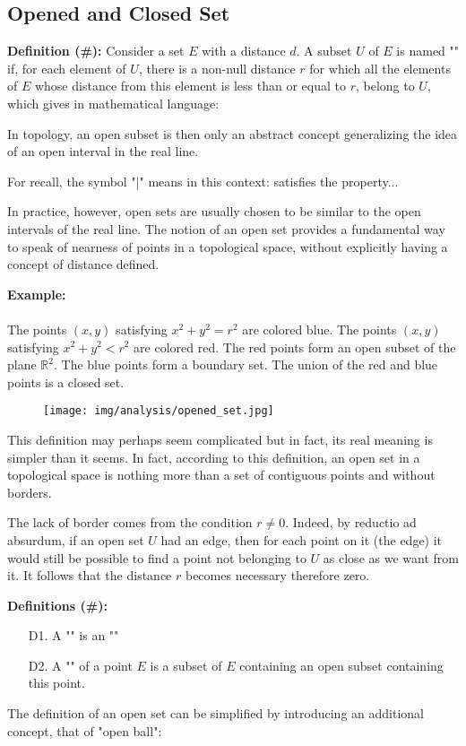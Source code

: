 	\subsection{Opened and Closed Set}
	\textbf{Definition (\#\mydef):} Consider a set $E$ with a distance $d$. A subset $U$ of $E$ is named "" if, for each element of $U$, there is a non-null distance $r$ for which all the elements of $E$ whose distance from this element is less than or equal to $r$, belong to $U$, which gives in mathematical language:
	
	In topology, an open subset is then only an abstract concept generalizing the idea of an open interval in the real line.
	\begin{tcolorbox}[title=Remark,colframe=black,arc=10pt]
	For recall, the symbol "|" means in this context: satisfies the property...
	\end{tcolorbox}	
	In practice, however, open sets are usually chosen to be similar to the open intervals of the real line. The notion of an open set provides a fundamental way to speak of nearness of points in a topological space, without explicitly having a concept of distance defined. 
	\begin{tcolorbox}[colframe=black,colback=white,sharp corners]
	\textbf{{\Large {}}Example:}\\\\
	The points $(x, y)$ satisfying $x^2 + y^2 = r^2$ are colored blue. The points $(x, y)$ satisfying $x^2 + y^2 < r^2$ are colored red. The red points form an open subset of the plane $\mathbb{R}^2$. The blue points form a boundary set. The union of the red and blue points is a closed set.
	\begin{figure}[H]
		\centering
		\texttt{[image: img/analysis/opened\_set.jpg]}
	\end{figure}
	\end{tcolorbox}
	This definition may perhaps seem complicated but in fact, its real meaning is simpler than it seems. In fact, according to this definition, an open set in a topological space is nothing more than a set of contiguous points and without borders.
	
	The lack of border comes from the condition $r\neq 0$. Indeed, by reductio ad absurdum, if an open set $U$ had an edge, then for each point on it (the edge) it would still be possible to find a point not belonging to $U$ as close as we want from it. It follows that the distance $r$ becomes necessary therefore zero.

	\textbf{Definitions (\#\mydef):} 
	\begin{enumerate}
		\item[D1.] A "" is an ""

		\item[D2.] A "" of a point $E$ is a subset of $E$ containing an open subset containing this point.
	\end{enumerate}
	The definition of an open set can be simplified by introducing an additional concept, that of "open ball":
	
